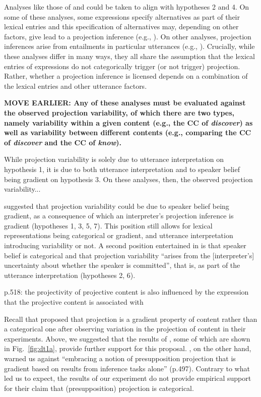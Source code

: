 \documentclass[11pt,fleqn]{article}
\newcommand{\6}{\mbox{$[\hspace*{-.6mm}[$}}
\newcommand{\9}{\mbox{$]\hspace*{-.6mm}]$}}
\begin{document}
Analyses like those of \citealt{abrusan2011,abrusan2016,abusch02,abusch10,romoli2015} and \citealt{brst-salt10,simons-etal2017} could be taken to align with hypotheses 2 and 4. On some of these analyses, some expressions specify alternatives as part of their lexical entries and this specification of alternatives may, depending on other factors, give lead to a projection inference (e.g., \citealt{abusch02,abusch10,romoli2015}). On other analyses, projection inferences arise from entailments in particular utterances (e.g., \citealt{abrusan2011,abrusan2016,brst-salt10,simons-etal2017}). Crucially, while these analyses differ in many ways, they all share the assumption that the lexical entries of expressions do not categorically trigger (or not trigger) projection. Rather, whether a projection inference is licensed depends on a combination of the lexical entries and other utterance factors. 

{\bf MOVE EARLIER: Any of these analyses must be evaluated against the observed projection variability, of which there are two types, namely variability within a given content (e.g., the CC of {\em discover}) as well as variability between different contents (e.g., comparing the CC of {\em discover} and the CC of {\em know}).}

While projection variability is solely due to utterance interpretation on hypothesis 1, it is due to both utterance interpretation and to speaker belief being gradient on hypothesis 3. 
On these analyses, then, the observed projection variability...


\citealt[498f.]{tbd-variability} suggested that projection variability could be due to speaker belief being gradient, as a consequence of which an interpreter's  projection inference is gradient (hypotheses 1, 3, 5, 7). This position still allows for lexical representations being categorical or gradient, and utterance interpretation introducing variability or not. A second position entertained in \citealt[498f.]{tbd-variability} is that speaker belief is categorical and that projection variability ``arises from the [interpreter's] uncertainty about whether the speaker is committed'', that is, as part of the utterance interpretation (hypotheses 2, 6).


p.518: the projectivity of projective content is also influenced by the expression that the projective content is associated with

Recall that \citealt[498]{tbd-variability} proposed that projection is a gradient property of content rather than a categorical one after observing variation in the projection of content in their experiments. Above, we suggested that the results of \citealt{degen-tonhauser-language}, some of which are shown in Fig.~\ref{fig:dt1a}, provide further support for this proposal. \citealt{mandelkern-etal2020}, on the other hand, warned us against ``embracing a notion of presupposition projection that is gradient based on results from inference tasks alone'' (p.497). Contrary to what \citealt{mandelkern-etal2020} led us to expect, the results of our experiment do not provide empirical support for their claim that (presupposition) projection is categorical.
\end{document}
